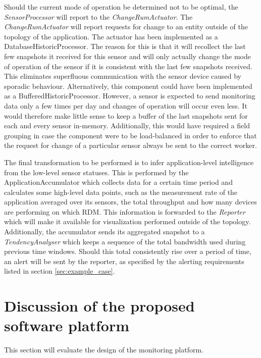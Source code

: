 Should the current mode of operation be determined not to be optimal, the \emph{SensorProcessor} will report to the \emph{ChangeRumActuator}. The \emph{ChangeRumActuator} will report requests for change to an entity outside of the topology of the application. The actuator has been implemented as a DatabaseHistoricProcessor. The reason for this is that it will recollect the last few snapshots it received for this sensor and will only actually change the mode of operation of the sensor if it is consistent with the last few snapshots received. This eliminates superfluous communication with the sensor device caused by sporadic behaviour. Alternatively, this component could have been implemented as a BufferedHistoricProcessor. However, a sensor is expected to send monitoring data only a few times per day and changes of operation will occur even less. It would therefore make little sense to keep a buffer of the last snapshots sent for each and every sensor in-memory. Additionally, this would have required a field grouping in case the component were to be load-balanced in order to enforce that the request for change of a particular sensor always be sent to the correct worker.

The final transformation to be performed is to infer application-level intelligence from the low-level sensor statuses. This is performed by the ApplicationAccumulator which collects data for a certain time period and calculates some high-level data points, such as the measurement rate of the application averaged over its sensors, the total throughput and how many devices are performing on which RDM. This information is forwarded to the \emph{Reporter} which will make it available for visualization performed outside of the topology. Additionally, the accumulator sends its aggregated snapshot to a \emph{TendencyAnalyser} which keeps a sequence of the total bandwidth used during previous time windows. Should this total consistently rise over a period of time, an alert will be sent by the reporter, as specified by the alerting requirements listed in section \ref{sec:example_case}.
	
\section{Discussion of the proposed software platform}
This section will evaluate the design of the monitoring platform.

